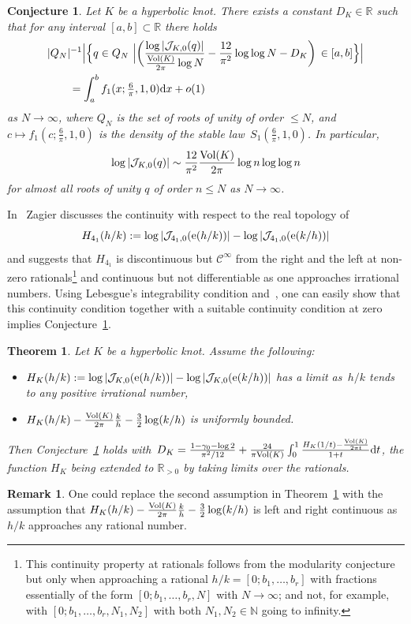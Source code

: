 \documentclass[11pt]{amsart}
\newcommand{\R}{\mathbb{R}}
\newcommand{\N}{\mathbb{N}}
\newcommand{\J}{\mathcal{J}}
\newcommand{\tn}[1]{\textnormal{#1}}
\newtheorem{theo}{Theorem}
\newtheorem{conj}[ezer]{Conjecture}
\theoremstyle{definition}
\newtheorem{remark}{Remark}
\newcommand{\pr}[1]{\mathchoice{\left( #1\right)}{(#1)}{(#1)}{(#1)}}
\newcommand{\e}[1][]{\ifthenelse{\equal{#1}{}}{{\rm e}}{\operatorname{e}\pr{ #1}}}
\newcommand{\df}{\mathrm{d}}
\newcommand{\1}{{\mathbf 1}}
\newcommand{\gh}{H}
\let\originalleft\left
\let\originalright\right
\renewcommand{\left}{\mathopen{}\mathclose\bgroup\originalleft}
\renewcommand{\right}{\aftergroup\egroup\originalright}
\numberwithin{equation}{section}
\begin{document}
\begin{conj}\label{conj:zagier2}
  Let $K$ be a hyperbolic knot.
  There exists a constant $D_{K}\in\R$ such that for any interval $[a,b]\subset\R$ there holds
  \begin{equation}\label{eq:conj}
    \begin{split}
      &|Q_N|^{-1}\Big|\Big\{q\in Q_N\  \Big | \bigg(\frac{ \log |\J_{K,0}(q)|}{\frac{\tn{Vol}(K)}{2\pi} \log N}-\frac{12 }{\pi^2 } \log \log N -D_{K}\bigg)\, \in [a,b]\Big\}\Big|\\
      & \qquad = \int_a^b f_1(x; \tfrac6\pi, 1, 0) \df x + o(1)
    \end{split}
  \end{equation}
  as $N\to\infty$, where $Q_N$ is the set of roots of unity of order $\leq N$, and~$c\mapsto f_1(c; \tfrac6\pi, 1, 0)$ is the density of the stable law~$S_1(\tfrac6\pi,1,0)$. In particular,
  $$
  \log |\J_{K,0}(q)|\sim \frac{12 }{\pi^2 }\frac{\tn{Vol}(K)}{2\pi} \log n \log \log n
  $$
  for almost all roots of unity $q$ of order $n\leq N$ as $N\to\infty$.
\end{conj}


In~\cite{Zagier2010} Zagier discusses the continuity with respect to the real topology of $$\gh_{4_1}(h/k):=\log |\J_{4_1,0}(\e[h/k])|-\log |\J_{4_1,0}(\e[k/h])|$$ 
and suggests that $\gh_{4_1}$ is discontinuous but $\mathcal C^{\infty}$ from the right and the left at non-zero {rationals}\footnote{This continuity property at rationals follows from the modularity conjecture but only when approaching a rational $h/k=[0;b_1,\dots,b_r]$ with fractions essentially of the form $[0;b_1,\dots,b_r,N]$ with $N\to\infty$; and not, for example, with $[0;b_1,\dots,b_r,N_1,N_2]$ with both $N_1,N_2\in\N$ going to infinity.}
and continuous but not differentiable as one approaches irrational numbers. Using Lebesgue's integrability condition and~\cite{BettinDrappeau}, 
one can easily show that this continuity condition together with a suitable continuity condition at zero implies Conjecture~\ref{conj:zagier2}.

\begin{theo}\label{th:pz}
  Let $K$ be a hyperbolic knot. Assume the following:
  \begin{itemize}
  \item $\gh_{K}(h/k):=\log |\J_{K,0}(\e[h/k])|-\log |\J_{K,0}(\e[k/h])|$ has a limit as~$h/k$ tends to any positive irrational number, 
  \item $\gh_{K}(h/k)-\frac{\tn{Vol} (K)}{2\pi}\frac{k}h-\frac{3}2\log (k/h)$ is uniformly bounded.
  \end{itemize}
  Then Conjecture~\ref{conj:zagier2} holds with~$D_K = \frac{1-\gamma_0-\log 2}{\pi^2/12} + \frac{24}{\pi\tn{Vol}(K)}\int_0^1 \frac{\gh_{K}(1/t) - \frac{\tn{Vol}(K)}{2\pi t}}{1+t}\df t$, the function $\gh_{K}$ being extended to $\R_{>0}$ by taking limits over the rationals.
\end{theo}
\begin{remark}
  One could replace the second assumption in Theorem~\ref{th:pz} with the assumption that  $\gh_{K}(h/k)-\frac{\tn{Vol} (K)}{2\pi}\frac{k}h-\frac{3}2\log (k/h)$ is left and right continuous as $h/k$ approaches any rational number.
\end{remark}
\end{document}
